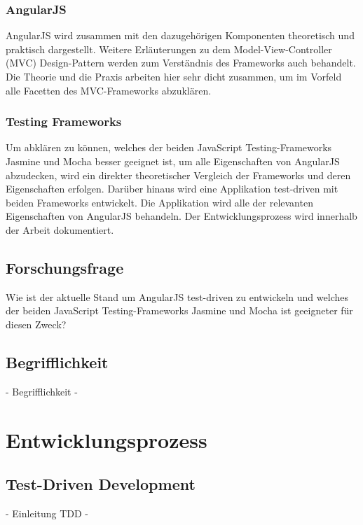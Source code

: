 \subsubsection{AngularJS}
AngularJS wird zusammen mit den dazugehörigen Komponenten theoretisch und
praktisch dargestellt. Weitere Erläuterungen zu dem {\glqq 
Model-View-Controller (MVC)\grqq} Design-Pattern werden zum Verständnis des
Frameworks auch behandelt.
Die Theorie und die Praxis arbeiten hier sehr dicht zusammen, um im Vorfeld
alle Facetten des MVC-Frameworks abzuklären.

\subsubsection{Testing Frameworks}
Um abklären zu können, welches der beiden JavaScript Testing-Frameworks 
{\glqq Jasmine\grqq} und {\glqq Mocha\grqq} besser geeignet ist, um alle
Eigenschaften von AngularJS abzudecken, wird ein direkter theoretischer
Vergleich der Frameworks und deren Eigenschaften erfolgen. Darüber hinaus wird 
eine Applikation test-driven mit beiden Frameworks entwickelt. Die Applikation
wird alle der relevanten Eigenschaften von AngularJS behandeln. Der 
Entwicklungsprozess wird innerhalb der Arbeit dokumentiert.

\subsection{Forschungsfrage}
Wie ist der aktuelle Stand um AngularJS test-driven zu entwickeln und welches 
der beiden JavaScript Testing-Frameworks {\glqq Jasmine\grqq} und {\glqq 
Mocha\grqq} ist geeigneter für diesen Zweck?

\subsection{Begrifflichkeit}
 - Begrifflichkeit -

\newpage
\section{Entwicklungsprozess}
\label{Entwicklungsprozess}

\subsection{Test-Driven Development}
\label{section:Test-Driven Development}
 - Einleitung TDD -
